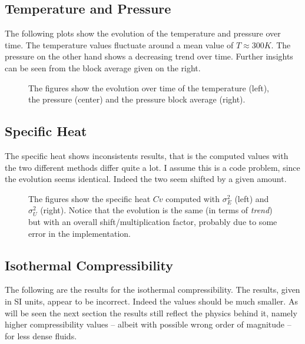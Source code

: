 \documentclass[aps,pra,reprint, onecolumn, rmp]{revtex4-2}
\begin{document}
\subsection{Temperature and Pressure}
The following plots show the evolution of the temperature and pressure over time. The temperature values fluctuate around a mean value of  $T\approx300K$. The pressure on the other hand shows a decreasing trend over time. Further insights can be seen from the block average given on the right.

\begin{figure}[h]
     \centering
     \caption{The figures show the evolution over time of the temperature (left), the pressure (center) and the pressure block average (right).}
    
\end{figure}


\subsection{Specific Heat}
The specific heat shows inconsistents results, that is the computed values with the two different methods differ quite a lot. I assume this is a code problem, since the evolution seems identical. Indeed the two seem shifted by a given amount. 
\begin{figure}[h]
     \centering
     \caption{The figures show the specific heat $Cv$ computed with $\sigma_E^2$ (left) and $\sigma_U^2$ (right). Notice that the evolution is the same (in terms of \textit{trend}) but with an overall shift/multiplication factor, probably due to some error in the implementation.}
    
\end{figure}

\subsection{Isothermal Compressibility}
The following are the results for the isothermal compressibility. The results, given in SI units, appear to be incorrect. Indeed the values should be much smaller. As will be seen the next section the results still reflect the physics behind it, namely higher compressibility values -- albeit with possible wrong order of magnitude -- for less dense fluids.
\end{document}
